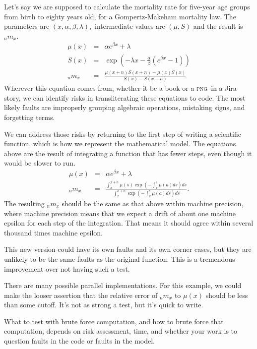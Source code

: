 \documentclass[fleqn,10pt]{olplainarticle}
\begin{document}
Let's say we are supposed to calculate the mortality rate
for five-year age groups from birth to eighty years old,
for a Gompertz-Makeham mortality law. The parameters are
$(x, \alpha, \beta, \lambda),$ intermediate values are $(\mu, S)$ and the result is ${}_nm_x$.
\begin{eqnarray}
  \mu(x) & =&  \alpha e^{\beta x} + \lambda \\
  S(x) & = & \exp\left(-\lambda x - \frac{\alpha}{\beta}\left(e^{\beta x} - 1\right)\right) \\
  {}_nm_x & = & \frac{\mu(x+n) S(x+n) - \mu(x)S(x)}{S(x) - S(x+n)}
\end{eqnarray}
Wherever this equation comes from, whether it be a book or a
\textsc{png}\ in a Jira story, we can identify risks in transliterating
these equations to code. The most likely faults are improperly grouping
algebraic operations, mistaking signs, and forgetting terms. 

We can address those risks by returning to the first step of writing
a scientific function, which is how we represent the mathematical model.
The equations above are the result of integrating a function that has fewer
steps, even though it would be slower to run.
\begin{eqnarray}
  \mu(x) & =&  \alpha e^{\beta x} + \lambda \\
  {}_nm_x & = &\frac{\int_{x}^{x+n}\mu(s) \exp(-\int_{x}^s\mu(a)ds)ds}{\int_{x}^{x+n}\exp(-\int_{x}^s\mu(a)ds)ds}.
\end{eqnarray}
The resulting ${}_nm_x$ should be the same as that above within
machine precision, where machine precision means that we expect a drift
of about one machine epsilon for each step of the integration. That means
it should agree within several thousand times machine epsilon.

This new version could have its own faults and its
own corner cases, but they are unlikely to be the same faults
as the original function. This is a tremendous improvement over
not having such a test.

There are many possible parallel implementations. For this example,
we could make the looser assertion that the relative error of ${}_nm_x$
to $\mu(x)$ should be less than some cutoff. It's not as strong a test,
but it's quick to write.

What to test with brute force computation, and how to brute
force that computation, depends on risk assessment, time, and
whether your work is to question faults in the code or faults
in the model.
\end{document}
